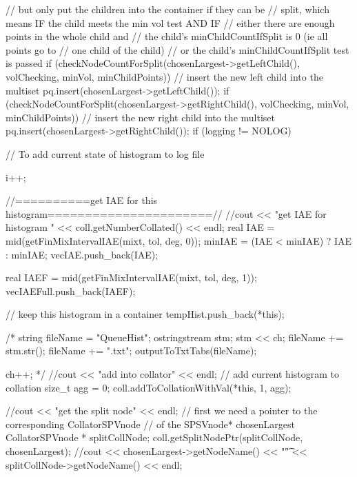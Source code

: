 \begin{DoxyCode}
{{{            // but only put the children into the container if they can be
            // split, which means IF the child meets the min vol test AND IF
            // either there are enough points in the whole child and
                // the child's minChildCountIfSplit is 0 (ie all points go to
                // one child of the child)
            // or the child's minChildCountIfSplit test is passed
            if (checkNodeCountForSplit(chosenLargest->getLeftChild(),
                    volChecking, minVol, minChildPoints)) {
                // insert the new left child into the multiset
                pq.insert(chosenLargest->getLeftChild());
            }
            if (checkNodeCountForSplit(chosenLargest->getRightChild(),
                    volChecking, minVol, minChildPoints)) {
                // insert the new right child into the multiset
                pq.insert(chosenLargest->getRightChild());
            }
            if (logging != NOLOG) {
                // To add current state of histogram to log file               
          
                i++;
            }

          //==========get IAE for this histogram======================//
        //cout << "get IAE for histogram " << coll.getNumberCollated() << endl;
        real IAE = mid(getFinMixIntervalIAE(mixt, tol, deg, 0));
        minIAE = (IAE < minIAE) ? IAE : minIAE;
        vecIAE.push_back(IAE); 
        
        real IAEF = mid(getFinMixIntervalIAE(mixt, tol, deg, 1));
        vecIAEFull.push_back(IAEF); 
        
        
        // keep this histogram in a container 
        tempHist.push_back(*this);
        
        /*
        string fileName = "QueueHist";
        ostringstream stm;
        stm << ch;
        fileName += stm.str();
        fileName += ".txt";
        outputToTxtTabs(fileName);
        
        ch++;
        */
        //cout << "add into collator" << endl;
        // add current histogram to collation
        size_t agg = 0;
        coll.addToCollationWithVal(*this, 1, agg);
          
        //cout << "get the split node" << endl;
        // first we need a pointer to the corresponding CollatorSPVnode 
        // of the SPSVnode* chosenLargest     
        CollatorSPVnode * splitCollNode;
        coll.getSplitNodePtr(splitCollNode, chosenLargest);
        //cout << chosenLargest->getNodeName() << "\t" <<
       splitCollNode->getNodeName() << endl;
        
}}}
\end{DoxyCode}
